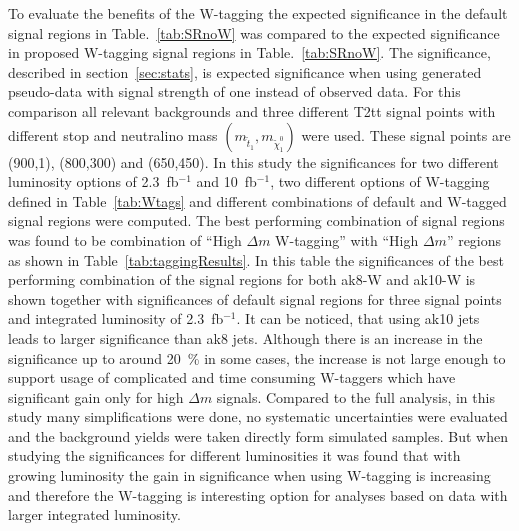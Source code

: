 To evaluate the benefits of the W-tagging the expected significance in the default signal regions in Table.~\ref{tab:SRnoW} was compared to the expected significance in proposed W-tagging signal regions in Table.~\ref{tab:SRnoW}. The significance, described in section~\ref{sec:stats}, is expected significance when using generated pseudo-data with signal strength of one instead of observed data. For this comparison all relevant backgrounds and three different T2tt signal points with different stop and neutralino mass $(m_{\tilde{t}_{1}}, m_{\tilde{\chi}^{0}_{1}})$ were used. These signal points are (900,1), (800,300) and (650,450). In this study the significances for two different luminosity options of 2.3~fb$^{-1}$ and 10~fb$^{-1}$, two different options of W-tagging defined in Table~\ref{tab:Wtags} and different combinations of default and W-tagged signal regions were computed. The best performing combination of signal regions was found to be combination of ``High $\Delta m$ W-tagging'' with ``High $\Delta m$'' regions as shown in Table~\ref{tab:taggingResults}. In this table the significances of the best performing combination of the signal regions for both ak8-W and ak10-W is shown together with significances of default signal regions for three signal points and integrated luminosity of 2.3~fb$^{-1}$. It can be noticed, that using ak10 jets leads to larger significance than ak8 jets. Although there is an increase in the significance up to around 20~\% in some cases, the increase is not large enough to support usage of complicated and time consuming W-taggers which have significant gain only for high $\Delta m$ signals. Compared to the full analysis, in this study many simplifications were done, no systematic uncertainties were evaluated and the background yields were taken directly form simulated samples. But when studying the significances for different luminosities it was found that with growing luminosity the gain in significance when using W-tagging is increasing and therefore the W-tagging is interesting option for analyses based on data with larger integrated luminosity. 

